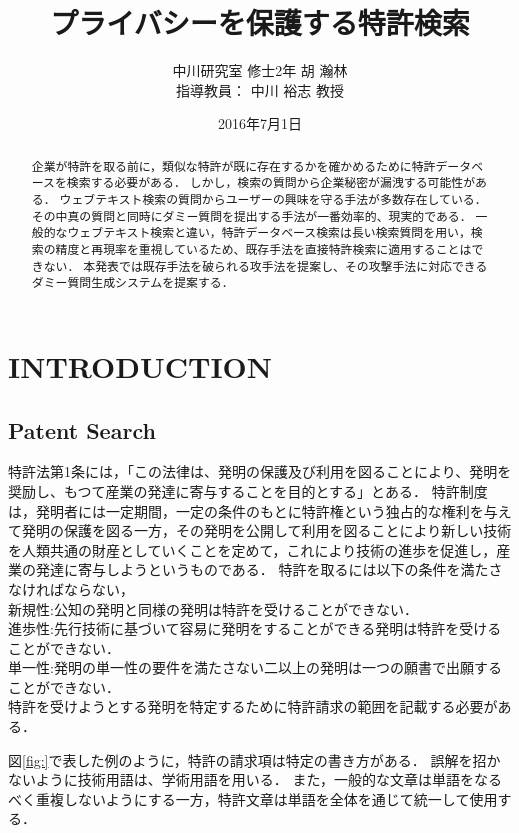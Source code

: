 \documentclass{jsarticle}
\title{プライバシーを保護する特許検索}
\author{中川研究室 修士2年 胡 瀚林\\指導教員： 中川 裕志 教授}
\date{2016年7月1日}
\theoremstyle{definition}
\begin{document}
\maketitle
\begin{abstract}
企業が特許を取る前に，類似な特許が既に存在するかを確かめるために特許データベースを検索する必要がある．
しかし，検索の質問から企業秘密が漏洩する可能性がある．
ウェブテキスト検索の質問からユーザーの興味を守る手法が多数存在している．
その中真の質問と同時にダミー質問を提出する手法が一番効率的、現実的である．
一般的なウェブテキスト検索と違い，特許データベース検索は長い検索質問を用い，検索の精度と再現率を重視しているため、既存手法を直接特許検索に適用することはできない．
本発表では既存手法を破られる攻手法を提案し、その攻撃手法に対応できるダミー質問生成システムを提案する．
\end{abstract}


\section{INTRODUCTION}


\subsection{Patent Search}
特許法第1条には，「この法律は、発明の保護及び利用を図ることにより、発明を奨励し、もつて産業の発達に寄与することを目的とする」とある．\cite{}
特許制度は，発明者には一定期間，一定の条件のもとに特許権という独占的な権利を与えて発明の保護を図る一方，その発明を公開して利用を図ることにより新しい技術を人類共通の財産としていくことを定めて，これにより技術の進歩を促進し，産業の発達に寄与しようというものである．\cite{}
特許を取るには以下の条件を満たさなければならない，\\
新規性:公知の発明と同様の発明は特許を受けることができない．\\
進歩性:先行技術に基づいて容易に発明をすることができる発明は特許を受けることができない．\\
単一性:発明の単一性の要件を満たさない二以上の発明は一つの願書で出願することができない．\\

特許を受けようとする発明を特定するために特許請求の範囲を記載する必要がある．

図\ref{fig:}で表した例のように，特許の請求項は特定の書き方がある．
誤解を招かないように技術用語は、学術用語を用いる．
また，一般的な文章は単語をなるべく重複しないようにする一方，特許文章は単語を全体を通じて統一して使用する．
\end{document}
